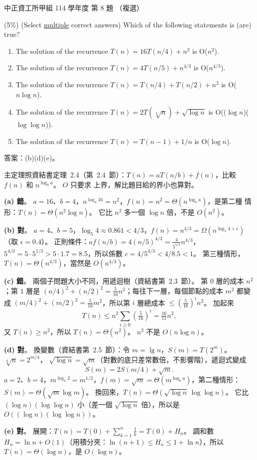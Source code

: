 \begin{pastexam}[label={px:ccu-114-swa-08}]{中正資工所甲組 114 學年度 第 8 題}
（複選）

(5\%) (Select \underline{multiple} correct answers) Which of the following statements is (are) true?
\begin{enumerate}[label=(\alph*)]
\item The solution of the recurrence $T(n)=16T(n/4)+n^2$ is O($n^2$).
\item The solution of the recurrence $T(n)=4T(n/5)+n^{4/3}$ is O($n^{4/3}$).
\item The solution of the recurrence $T(n)=T(n/4)+T(n/2)+n^2$ is O($n\log n$).
\item The solution of the recurrence $T(n)=2T(\sqrt[4]{n})+\sqrt{\log n}$ is O(($\log n$)($\log\log n$)).
\item The solution of the recurrence $T(n)=T(n-1)+1/n$ is O($\log n$).
\end{enumerate}
\end{pastexam}

\begin{pastsoln}
答案：(b)(d)(e)。

主定理照資結書定理~2.4（第~2.4~節）：$T(n) = aT(n/b) + f(n)$，比較 $f(n)$ 和 $n^{\log_b a}$。 $O$ 只要求
上界，解比題目給的界小也算對。

\textbf{(a) 錯}。 $a = 16$、$b = 4$，$n^{\log_4 16} = n^2$，$f(n) = n^2 = \Theta(n^{\log_b a})$，是第二種
情形：$T(n) = \Theta(n^2 \log n)$。 它比 $n^2$ 多一個 $\log n$ 倍，不是 $O(n^2)$。

\textbf{(b) 對}。 $a = 4$、$b = 5$，$\log_5 4 \approx 0.861 < 4/3$，$f(n) = n^{4/3} = \Omega(n^{\log_5 4 +
\epsilon})$（取 $\epsilon = 0.4$）。 正則條件：$a f(n/b) = 4 (n/5)^{4/3} = \frac{4}{5^{4/3}} n^{4/3}$，
$5^{4/3} = 5 \cdot 5^{1/3} > 5 \cdot 1.7 = 8.5$，所以係數 $c = 4/5^{4/3} < 4/8.5 < 1$。 第三種情形，
$T(n) = \Theta(n^{4/3})$，當然是 $O(n^{4/3})$。

\textbf{(c) 錯}。 兩個子問題大小不同，用遞迴樹（資結書第~2.3~節）。 第 $0$ 層的成本 $n^2$；第 $1$ 層是
$(n/4)^2 + (n/2)^2 = \frac{5}{16} n^2$；每往下一層，每個節點的成本 $m^2$ 都變成
$(m/4)^2 + (m/2)^2 = \frac{5}{16} m^2$，所以第 $i$ 層總成本 $\le (\frac{5}{16})^i n^2$。 加起來
\[
T(n) \le n^2 \sum_{i \ge 0} \left(\tfrac{5}{16}\right)^i = \tfrac{16}{11} n^2,
\]
又 $T(n) \ge n^2$，所以 $T(n) = \Theta(n^2)$。 $n^2$ 不是 $O(n \log n)$。

\textbf{(d) 對}。 換變數（資結書第~2.5~節）：令 $m = \lg n$，$S(m) = T(2^m)$。 $\sqrt[4]{n} = 2^{m/4}$，
$\sqrt{\log n} = \sqrt{m}$（對數的底只差常數倍，不影響階），遞迴式變成
\[
S(m) = 2S(m/4) + \sqrt{m}.
\]
$a = 2$、$b = 4$，$m^{\log_4 2} = m^{1/2}$，$f(m) = \sqrt{m} = \Theta(m^{\log_b a})$，第二種情形：
$S(m) = \Theta(\sqrt{m} \log m)$。 換回來，$T(n) = \Theta(\sqrt{\log n}\, \log\log n)$。 它比
$(\log n)(\log\log n)$ 小（差一個 $\sqrt{\log n}$ 倍），所以是 $O((\log n)(\log\log n))$。

\textbf{(e) 對}。 展開：$T(n) = T(0) + \sum_{k=1}^{n} \frac{1}{k} = T(0) + H_n$。 調和數
$H_n = \ln n + O(1)$（用積分夾：$\ln(n+1) \le H_n \le 1 + \ln n$），所以 $T(n) = \Theta(\log n)$，是
$O(\log n)$。
\end{pastsoln}
